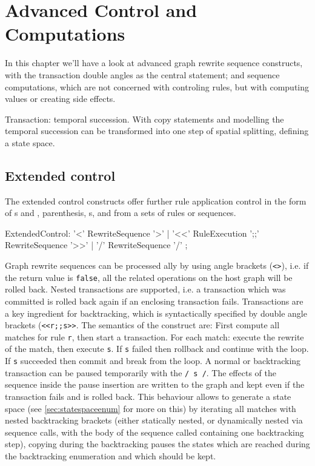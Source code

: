 \chapter{Advanced Control and Computations}
\label{cha:transaction}

In this chapter we'll have a look at advanced graph rewrite sequence constructs,
with the transaction double angles as the central statement;
and sequence computations, which are not concerned with controling rules,
but with computing values or creating side effects.

Transaction: temporal succession.
With copy statements and modelling the temporal succession can be transformed into one step of spatial splitting, defining a state space.

\section{Extended control}\label{sec:extctrl}

The extended control constructs offer further rule application control in the form of s and , parenthesis, s, and  from a sets of rules or sequences.

\begin{rail} 
  ExtendedControl: 
    '<' RewriteSequence '>' | 
    '<<' RuleExecution ';;' RewriteSequence '>>' |
    '/' RewriteSequence '/'
	;
\end{rail}

Graph rewrite sequences can be processed ally by using angle brackets (\texttt{<>}), i.e.
if the return value is \texttt{false}, all the related operations on the host graph will be rolled back.
Nested transactions are supported, i.e. a transaction which was committed is rolled back again if an enclosing transaction fails.
Transactions are a key ingredient for backtracking, which is syntactically specified by double angle brackets (\texttt{<<r;;s>>}.
The semantics of the construct are:
First compute all matches for rule \texttt{r}, then start a transaction.
For each match: execute the rewrite of the match, then execute \texttt{s}.
If \texttt{s} failed then rollback and continue with the loop.
If \texttt{s} succeeded then commit and break from the loop.
A normal or backtracking transaction can be paused temporarily with the  \texttt{/ s /}.
The effects of the sequence inside the pause insertion are written to the graph and kept even if the transaction fails and is rolled back.
This behaviour allows to generate a state space (see \ref{sec:statespaceenum} for more on this) by iterating all matches with nested backtracking brackets (either statically nested, or dynamically nested via sequence calls, with the body of the sequence called containing one backtracking step), copying during the backtracking pauses the states which are reached during the backtracking enumeration and which should be kept.

